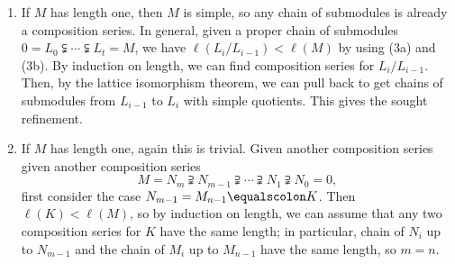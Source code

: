 \documentclass[12pt]{amsart}
\renewcommand{\1}{\mathbbm{1}}
\newcommand{\solution}[1]{\ifthenelse {\equal{\displaysol}{1}} {\begin{framed}{\color{meretale}\noindent #1}\end{framed}} { \ }}
\newcommand\itemb{\stepcounter{enumii}\item[(\theenumii)]}
\begin{document}
\begin{enumerate}
\solution{
\begin{enumerate}
\itemb If $M$ has length one, then $M$ is simple, so any chain of submodules is already a composition series. In general, given a proper chain of submodules $0 = L_0 \subsetneqq \cdots \subsetneqq L_t = M$, we have $\ell(L_i/L_{i-1}) < \ell(M)$ by using (3a) and (3b). By induction on length, we can find composition series for $L_i/L_{i-1}$. Then, by the lattice isomorphism theorem, we can pull back to get chains of submodules from $L_{i-1}$ to $L_i$ with simple quotients. This gives the sought refinement.
\itemb If $M$ has length one, again this is trivial. Given another composition series given another composition series
	\[ M = N_m \supsetneqq N_{m-1} \supsetneqq \cdots \supsetneqq N_1 \supsetneqq N_0 = 0,\]
	first consider the case $N_{m-1}=M_{n-1} \equalscolon K$. Then $\ell(K)<\ell(M)$, so by induction on length, we can assume that any two composition series for $K$ have the same length; in particular, chain of $N_i$ up to $N_{m-1}$ and the chain of $M_i$ up to $M_{n-1}$ have the same length, so $m=n$.
	

\end{enumerate}}
\end{enumerate}
\end{document}

